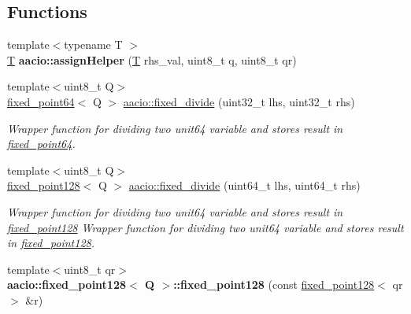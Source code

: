 \subsection*{Functions}
\begin{DoxyCompactItemize}
\item 
\mbox{\label{group__fixedpoint_ga2768a9d2b1ace147dd9233cced32607c}} 
{\footnotesize template$<$typename T $>$ }\\\mbox{\hyperlink{struct_t}{T}} {\bfseries aacio\+::assign\+Helper} (\mbox{\hyperlink{struct_t}{T}} rhs\+\_\+val, uint8\+\_\+t q, uint8\+\_\+t qr)
\item 
{\footnotesize template$<$uint8\+\_\+t Q$>$ }\\\mbox{\hyperlink{structaacio_1_1fixed__point64}{fixed\+\_\+point64}}$<$ Q $>$ \mbox{\hyperlink{group__fixedpoint_ga605ac661acc42c361ed85c4398e880d0}{aacio\+::fixed\+\_\+divide}} (uint32\+\_\+t lhs, uint32\+\_\+t rhs)
\begin{DoxyCompactList}\small\item\em Wrapper function for dividing two unit64 variable and stores result in \mbox{\hyperlink{structaacio_1_1fixed__point64}{fixed\+\_\+point64}}. \end{DoxyCompactList}\item 
{\footnotesize template$<$uint8\+\_\+t Q$>$ }\\\mbox{\hyperlink{structaacio_1_1fixed__point128}{fixed\+\_\+point128}}$<$ Q $>$ \mbox{\hyperlink{group__fixedpoint_gaa76cfb710309434652c4317c2d319c9e}{aacio\+::fixed\+\_\+divide}} (uint64\+\_\+t lhs, uint64\+\_\+t rhs)
\begin{DoxyCompactList}\small\item\em Wrapper function for dividing two unit64 variable and stores result in \mbox{\hyperlink{structaacio_1_1fixed__point128}{fixed\+\_\+point128}} Wrapper function for dividing two unit64 variable and stores result in \mbox{\hyperlink{structaacio_1_1fixed__point128}{fixed\+\_\+point128}}. \end{DoxyCompactList}\item 
\mbox{\label{group__fixedpoint_gabf3358c9828033e0479da02d783ee7b4}} 
{\footnotesize template$<$uint8\+\_\+t qr$>$ }\\{\bfseries aacio\+::fixed\+\_\+point128$<$ Q $>$\+::fixed\+\_\+point128} (const \mbox{\hyperlink{structaacio_1_1fixed__point128}{fixed\+\_\+point128}}$<$ qr $>$ \&r)
\item 

\end{DoxyCompactItemize}
